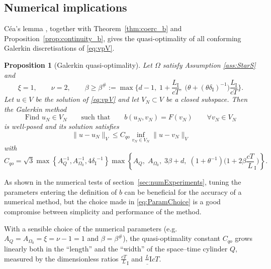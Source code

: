 \documentclass[a4paper]{article}
\theoremstyle{plain}
\newtheorem{proposition}[theorem]{Proposition}
\theoremstyle{definition}
\newcommand{\LI}{L_{\mathrm I}}
\newcommand{\deltaI}{{\delta_{\mathrm I}}}
\newcommand{\OZ}{{\Omega_0}}
\begin{document}
\subsection{Numerical implications}
\label{sec:NumImplications}
C\'ea's lemma \cite[Thm.~2.8.1]{BrennerScottRidgway2008}, together with Theorem~\ref{thm:coerc_b} and Proposition~\ref{prop:continuity_b}, gives the quasi-optimality of all conforming Galerkin discretisations of \eqref{eq:vpV}.
\begin{proposition}[Galerkin quasi-optimality]\label{lemma:cea}
Let $\Omega$ satisfy Assumption \ref{ass:StarS} and
\begin{equation}\label{eq:ParamChoice}
		\xi=1, \qquad \nu=2, \qquad \beta\ge\beta^\#:=\max\Big\{
		d-1,\;
		1+\frac{\LI}{cT},\;
		\big(\theta+(\theta\deltaI)^{-1}\big)\frac{\LI}{cT}
\Big\}.
	\end{equation}
Let $u \in V$ be the solution of \eqref{eq:vpV} and let $V_N \subset V$ be a closed subspace.
	Then the Galerkin method
	\begin{equation}\label{eq:Galerkin}
		\text{Find }u_N\in V_N \qquad\text{such that}\qquad b(u_N, v_N) = F(v_N) \qquad \forall v_N \in V_N
	\end{equation}
	is well-posed and its solution satisfies
	\begin{equation}
		\label{eq:QOest}
		\|u-u_N\|_V \leq C_{qo} \inf_{v_N \in V_N} \|u - v_N\|_V
	\end{equation}
	with
	\begin{equation}\label{eq:Cqo}
		C_{qo} = \sqrt3\max\left\{A_Q^{-1},A_\OZ^{-1},4\deltaI^{-1}\right\}\max\left\{A_Q,\;A_\OZ,\;
		3\beta+d,\;(1+\theta^{-1})\Big(1+2\beta\frac{cT}\LI\Big)
\right\}.
	\end{equation}
\end{proposition}
As shown in the numerical tests
of section~\ref{sec:numExperiments}, tuning the parameters entering the definition of $b$ can be beneficial for the accuracy of a numerical method, but the choice made in \eqref{eq:ParamChoice} is a good compromise between simplicity and performance of the method.

With a sensible choice of the numerical parameters (e.g.\ $A_Q=A_\OZ=\xi=\nu-1=1$ and $\beta=\beta^\#$), the quasi-optimality constant $C_{qo}$ grows linearly both in the ``length'' and the ``width'' of the space--time cylinder $Q$, measured by the dimensionless ratios $\frac{cT}\LI$ and $\frac\LI{cT}$.
\end{document}
